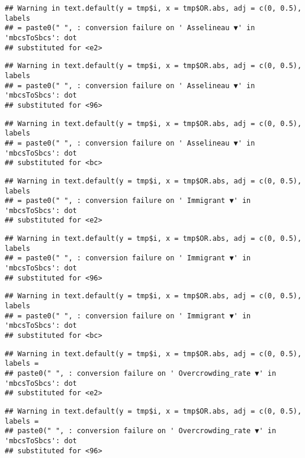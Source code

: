 \documentclass[
]{article}
\begin{document}
\begin{verbatim}
## Warning in text.default(y = tmp$i, x = tmp$OR.abs, adj = c(0, 0.5), labels
## = paste0(" ", : conversion failure on ' Asselineau ▼' in 'mbcsToSbcs': dot
## substituted for <e2>
\end{verbatim}

\begin{verbatim}
## Warning in text.default(y = tmp$i, x = tmp$OR.abs, adj = c(0, 0.5), labels
## = paste0(" ", : conversion failure on ' Asselineau ▼' in 'mbcsToSbcs': dot
## substituted for <96>
\end{verbatim}

\begin{verbatim}
## Warning in text.default(y = tmp$i, x = tmp$OR.abs, adj = c(0, 0.5), labels
## = paste0(" ", : conversion failure on ' Asselineau ▼' in 'mbcsToSbcs': dot
## substituted for <bc>
\end{verbatim}

\begin{verbatim}
## Warning in text.default(y = tmp$i, x = tmp$OR.abs, adj = c(0, 0.5), labels
## = paste0(" ", : conversion failure on ' Immigrant ▼' in 'mbcsToSbcs': dot
## substituted for <e2>
\end{verbatim}

\begin{verbatim}
## Warning in text.default(y = tmp$i, x = tmp$OR.abs, adj = c(0, 0.5), labels
## = paste0(" ", : conversion failure on ' Immigrant ▼' in 'mbcsToSbcs': dot
## substituted for <96>
\end{verbatim}

\begin{verbatim}
## Warning in text.default(y = tmp$i, x = tmp$OR.abs, adj = c(0, 0.5), labels
## = paste0(" ", : conversion failure on ' Immigrant ▼' in 'mbcsToSbcs': dot
## substituted for <bc>
\end{verbatim}

\begin{verbatim}
## Warning in text.default(y = tmp$i, x = tmp$OR.abs, adj = c(0, 0.5), labels =
## paste0(" ", : conversion failure on ' Overcrowding_rate ▼' in 'mbcsToSbcs': dot
## substituted for <e2>
\end{verbatim}

\begin{verbatim}
## Warning in text.default(y = tmp$i, x = tmp$OR.abs, adj = c(0, 0.5), labels =
## paste0(" ", : conversion failure on ' Overcrowding_rate ▼' in 'mbcsToSbcs': dot
## substituted for <96>
\end{verbatim}
\end{document}
